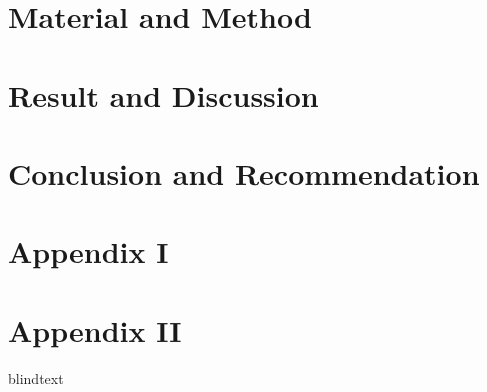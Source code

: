 \documentclass[12pt,a4paper]{report}%
\begin{document}
 \chapter{Material and Method}
 
 

 \chapter{Result and Discussion}
 

 \chapter{Conclusion and Recommendation}
 


\newpage
\printbibliography


\vspace*{2cm}
\newpage
\appendix

\chapter{Appendix I}
{\blindtext} %

\chapter{Appendix II}
{blindtext} %


\end{document}
